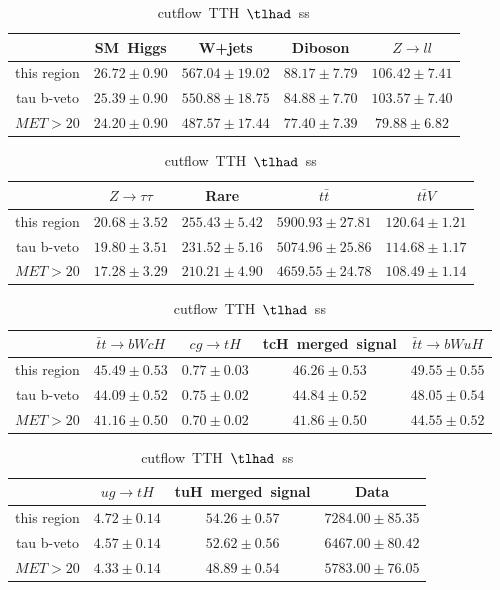 \begin{table}
\caption{cutflow~TTH~$\tlhad$~ss}
\centering
\begin{tabular}{|c|c|c|c|c|} \hline
 & SM~Higgs & W+jets & Diboson & $Z\to ll$\\\hline
this region & $26.72\pm0.90$ & $567.04\pm19.02$ & $88.17\pm7.79$ & $106.42\pm7.41$\\\hline
tau b-veto & $25.39\pm0.90$ & $550.88\pm18.75$ & $84.88\pm7.70$ & $103.57\pm7.40$\\\hline
$MET>20$ & $24.20\pm0.90$ & $487.57\pm17.44$ & $77.40\pm7.39$ & $79.88\pm6.82$\\\hline
\end{tabular}
\begin{tabular}{|c|c|c|c|c|} \hline
 & $Z\to \tau\tau$ & Rare & $t\bar{t}$ & $t\bar{t}V$\\\hline
this region & $20.68\pm3.52$ & $255.43\pm5.42$ & $5900.93\pm27.81$ & $120.64\pm1.21$\\\hline
tau b-veto & $19.80\pm3.51$ & $231.52\pm5.16$ & $5074.96\pm25.86$ & $114.68\pm1.17$\\\hline
$MET>20$ & $17.28\pm3.29$ & $210.21\pm4.90$ & $4659.55\pm24.78$ & $108.49\pm1.14$\\\hline
\end{tabular}
\begin{tabular}{|c|c|c|c|c|} \hline
 & $\bar{t}t\to bWcH$ & $cg\to tH$ & tcH~merged~signal & $\bar{t}t\to bWuH$\\\hline
this region & $45.49\pm0.53$ & $0.77\pm0.03$ & $46.26\pm0.53$ & $49.55\pm0.55$\\\hline
tau b-veto & $44.09\pm0.52$ & $0.75\pm0.02$ & $44.84\pm0.52$ & $48.05\pm0.54$\\\hline
$MET>20$ & $41.16\pm0.50$ & $0.70\pm0.02$ & $41.86\pm0.50$ & $44.55\pm0.52$\\\hline
\end{tabular}
\begin{tabular}{|c|c|c|c|} \hline
 & $ug\to tH$ & tuH~merged~signal & Data\\\hline
this region & $4.72\pm0.14$ & $54.26\pm0.57$ & $7284.00\pm85.35$\\\hline
tau b-veto & $4.57\pm0.14$ & $52.62\pm0.56$ & $6467.00\pm80.42$\\\hline
$MET>20$ & $4.33\pm0.14$ & $48.89\pm0.54$ & $5783.00\pm76.05$\\\hline
\end{tabular}
\label{tab:cutflow_reg1l1tau1b3j_ss}
\end{table}
